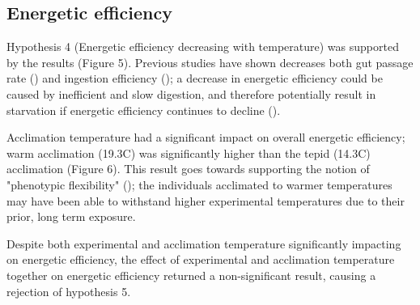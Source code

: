 \documentclass[../../Paper.tex]{subfiles}
\begin{document}
\subsection*{Energetic efficiency}

Hypothesis 4 (Energetic efficiency decreasing with temperature) was supported by the results (Figure 5). Previous 
studies have shown decreases both gut passage rate (\cite{mcconnachie_in_2004}) and ingestion efficiency 
(\cite{rall_temperature_2010}); a decrease in energetic efficiency could be caused by inefficient and slow digestion,
and therefore potentially result in starvation if energetic efficiency continues to decline (\cite{rall_temperature_2010,sentis_using_2012}). 

Acclimation temperature had a significant impact on overall energetic efficiency; warm acclimation (19.3\degree C)
was significantly higher than the tepid (14.3\degree C) acclimation (Figure 6). This result goes towards supporting the notion of "phenotypic 
flexibility" (\cite{piersma_phenotypic_2003,ahlgren_camouflaged_2013}); the individuals acclimated to warmer temperatures
may have been able to withstand higher experimental temperatures due to their prior, long term exposure. 

Despite both experimental and acclimation temperature significantly impacting on energetic efficiency, the effect
of experimental and acclimation temperature together on energetic efficiency returned a non-significant result,
causing a rejection of hypothesis 5. 
\end{document}
